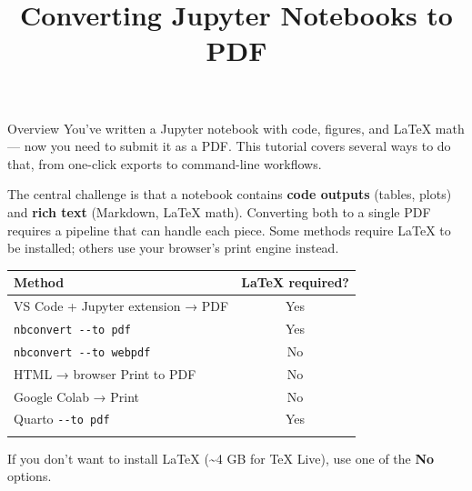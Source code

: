 \documentclass[
  ignorenonframetext,
  aspectratio=169,
]{beamer}
\title{\texorpdfstring{Converting Jupyter Notebooks to
PDF}{Converting Jupyter Notebooks to PDF}}
\author{}
\date{}
\newcounter{none} %
\begin{document}
\frame{\titlepage}


\begin{frame}[fragile]{Overview}
\protect{}\label{overview}
You've written a Jupyter notebook with code, figures, and LaTeX math ---
now you need to submit it as a PDF. This tutorial covers several ways to
do that, from one-click exports to command-line workflows.

The central challenge is that a notebook contains \textbf{code outputs}
(tables, plots) and \textbf{rich text} (Markdown, LaTeX math).
Converting both to a single PDF requires a pipeline that can handle each
piece. Some methods require LaTeX to be installed; others use your
browser's print engine instead.

\begin{tcolorbox}[enhanced jigsaw, arc=.35mm, bottomrule=.15mm, bottomtitle=1mm, breakable, colback=white, colbacktitle=quarto-callout-note-color!10!white, colframe=quarto-callout-note-color-frame, coltitle=black, left=2mm, leftrule=.75mm, opacityback=0, opacitybacktitle=0.6, rightrule=.15mm, title=\textcolor{quarto-callout-note-color}{\faInfo}\hspace{0.5em}{Do you need LaTeX installed?}, titlerule=0mm, toprule=.15mm, toptitle=1mm]

{\def\LTcaptype{none} %
\begin{longtable}[]{@{}lc@{}}
\toprule\noalign{}
Method & LaTeX required? \\
\midrule\noalign{}
\endhead
VS Code + Jupyter extension → PDF & Yes \\
\texttt{nbconvert\ -\/-to\ pdf} & Yes \\
\texttt{nbconvert\ -\/-to\ webpdf} & No \\
HTML → browser Print to PDF & No \\
Google Colab → Print & No \\
Quarto \texttt{-\/-to\ pdf} & Yes \\
\bottomrule\noalign{}
\end{longtable}
}

If you don't want to install LaTeX (\textasciitilde4 GB for TeX Live),
use one of the \textbf{No} options.

\end{tcolorbox}
\end{frame}
\end{document}
